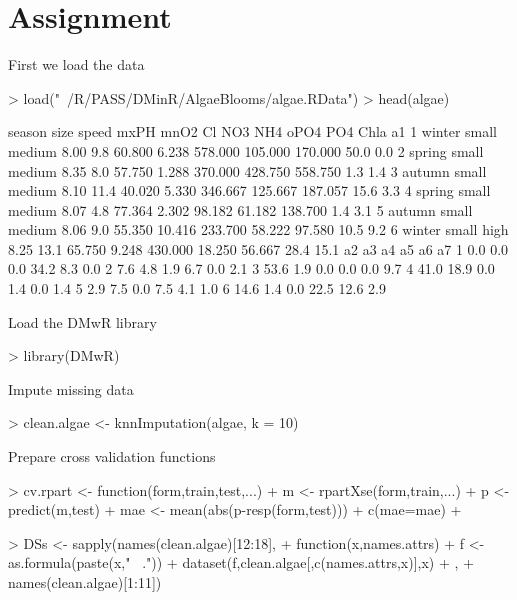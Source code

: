 \documentclass{article}
\begin{document}
\section*{Assignment}

First we load the data

\begin{Schunk}
\begin{Sinput}
> load("~/R/PASS/DMinR/AlgaeBlooms/algae.RData")
> head(algae)
\end{Sinput}
\begin{Soutput}
  season  size  speed mxPH mnO2     Cl    NO3     NH4    oPO4     PO4 Chla   a1
1 winter small medium 8.00  9.8 60.800  6.238 578.000 105.000 170.000 50.0  0.0
2 spring small medium 8.35  8.0 57.750  1.288 370.000 428.750 558.750  1.3  1.4
3 autumn small medium 8.10 11.4 40.020  5.330 346.667 125.667 187.057 15.6  3.3
4 spring small medium 8.07  4.8 77.364  2.302  98.182  61.182 138.700  1.4  3.1
5 autumn small medium 8.06  9.0 55.350 10.416 233.700  58.222  97.580 10.5  9.2
6 winter small   high 8.25 13.1 65.750  9.248 430.000  18.250  56.667 28.4 15.1
    a2   a3  a4   a5   a6  a7
1  0.0  0.0 0.0 34.2  8.3 0.0
2  7.6  4.8 1.9  6.7  0.0 2.1
3 53.6  1.9 0.0  0.0  0.0 9.7
4 41.0 18.9 0.0  1.4  0.0 1.4
5  2.9  7.5 0.0  7.5  4.1 1.0
6 14.6  1.4 0.0 22.5 12.6 2.9
\end{Soutput}
\end{Schunk}

Load the DMwR library
\begin{Schunk}
\begin{Sinput}
> library(DMwR)
\end{Sinput}
\end{Schunk}

Impute missing data
\begin{Schunk}
\begin{Sinput}
> clean.algae <- knnImputation(algae, k = 10)
\end{Sinput}
\end{Schunk}

Prepare cross validation functions

\begin{Schunk}
\begin{Sinput}
> cv.rpart <- function(form,train,test,...) {
+ m <- rpartXse(form,train,...)
+ p <- predict(m,test)
+ mae <- mean(abs(p-resp(form,test)))
+ c(mae=mae)
+ }
\end{Sinput}
\end{Schunk}

\begin{Schunk}
\begin{Sinput}
> DSs <- sapply(names(clean.algae)[12:18],
+ function(x,names.attrs) {
+ f <- as.formula(paste(x,"~ ."))
+ dataset(f,clean.algae[,c(names.attrs,x)],x)
+ },
+ names(clean.algae)[1:11])
\end{Sinput}
\end{Schunk}
\end{document}
